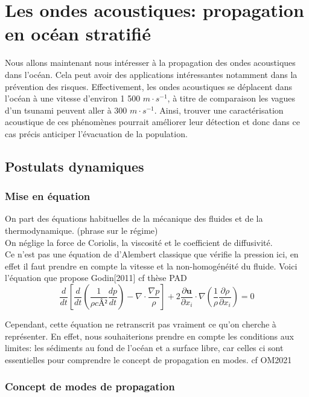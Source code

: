 \documentclass{rapportECC}
\begin{document}
\section{Les ondes acoustiques: propagation en océan stratifié}

Nous allons maintenant nous intéresser à la propagation des ondes acoustiques dans l'océan. Cela peut avoir des applications intéressantes notamment dans la prévention des risques. Effectivement, les ondes acoustiques se déplacent dans l'océan à une vitesse d'environ 1 500 $m \cdot s^{-1}$, à titre de comparaison les vagues d'un tsunami peuvent aller à 300 $m \cdot s^{-1}$. Ainsi, trouver une caractérisation acoustique de ces phénomènes pourrait améliorer leur détection et donc dans ce cas précis anticiper l'évacuation de la population.

\subsection{Postulats dynamiques}
\subsubsection{Mise en équation}


On part des équations habituelles de la mécanique des fluides et de la thermodynamique. (phrase sur le régime)
\\
On néglige la force de Coriolis, la viscosité et le coefficient de diffusivité.
\\
Ce n'est pas une équation de d'Alembert classique que vérifie la pression ici, en effet il faut prendre en compte la vitesse et la non-homogénéité du fluide. Voici l'équation que propose Godin[2011] cf thèse PAD
\begin{equation}
    \frac{d}{dt}[\frac{d}{dt}(\frac{1}{\rho cÂ²}\frac{dp}{dt}) - \nabla \cdot \frac{\nabla p}{\rho}] + 2\frac{\partial \mathbf{u}}{\partial x_i} \cdot \nabla (\frac{1}{\rho}\frac{\partial \rho}{\partial x_i}) = 0
\end{equation}

Cependant, cette équation ne retranscrit pas vraiment ce qu'on cherche à représenter. En effet, nous souhaiterions prendre en compte les conditions aux limites: les sédiments au fond de l'océan et a surface libre, car celles ci sont essentielles pour comprendre le concept de propagation en modes. cf OM2021

\subsubsection{Concept de modes de propagation}
\end{document}
